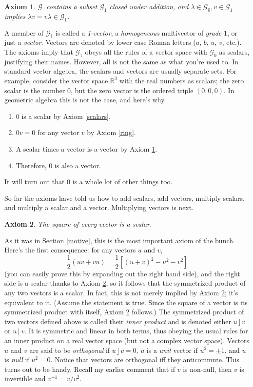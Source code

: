 \documentclass{utarticle}
\newcommand{\G}[1][]{\ensuremath{\mathcal{G}_{#1}}}
\DeclareMathOperator{\lin}{\rfloor}
\DeclareMathOperator{\rin}{\lfloor}
\newcommand{\half}{\ensuremath{\frac{1}{2}}}
\newtheorem{axiom}{Axiom}
\begin{document}
\begin{axiom}
\G\ contains a subset \G[1] closed under addition, and $\lambda \in \G[0], v \in \G[1]$ 
implies $\lambda v = v \lambda \in \G[1]$.
\label{vectors}
\end{axiom}

A member of \G[1] is called a \emph{1-vector}, a \emph{homogeneous} multivector 
of \emph{grade} $1$, or just a \emph{vector}.  Vectors are denoted by lower case 
Roman letters ($a$, $b$, $u$, $v$, etc.).  The axioms imply that \G[1] obeys all the 
rules of a vector space with \G[0] 
as scalars, justifying their names.  However, all is not the same as what
you're used to.  In standard vector algebra, the scalars and vectors are usually
separate sets.  For example, consider the vector space $\mathbb{R}^3$ 
with the real numbers as scalars; the zero scalar is the number $0$, but 
the zero vector is the ordered triple $(0,0,0)$.  In geometric algebra 
this is not the case, and here's why.
\begin{enumerate}
\item $0$ is a scalar by Axiom \ref{scalars}.
\item $0v=0$ for any vector $v$ by Axiom \ref{ring}.
\item A scalar times a vector is a vector by Axiom \ref{vectors}.
\item Therefore, $0$ is also a vector.  
\end{enumerate}
It will turn out that $0$ is a whole lot of other things too.

So far the axioms have told us how to add scalars,
add vectors, multiply scalars, and multiply a scalar and a
vector.  Multiplying vectors is next.

\begin{axiom}
The square of every vector is a scalar.
\label{sqvec}
\end{axiom}

As it was in Section \ref{motive}, this is the most important axiom of the bunch.  
Here's the first consequence: for any vectors $u$ and $v$,
\begin{equation}
\half(uv + vu) = \half\left[(u+v)^2 - u^2 - v^2\right]
\end{equation}
(you can easily prove this by expanding out the right hand side), and the right side 
is a scalar thanks to Axiom \ref{sqvec}, so it follows that the symmetrized product 
of any two vectors is a scalar.  In fact, this is not merely implied by 
Axiom \ref{sqvec}; it's equivalent to it.  (Assume the statement is true. 
Since the square of a vector is its symmetrized product with itself, Axiom \ref{sqvec} 
follows.)  The symmetrized product of two vectors defined above is called their
\emph{inner product} and is denoted either $u \lin v$ or $u \rin v$.  It is 
symmetric and linear in both terms, thus obeying the usual rules for an inner 
product on a real vector space (but not a complex vector space).  Vectors $u$ 
and $v$ are said to be \emph{orthogonal} if $u \lin v = 0$, $u$ is a \emph{unit} 
vector if $u^2=\pm1$, and $u$ is \emph{null} if $u^2=0$.  Notice that vectors 
are orthogonal iff they anticommute.  This turns out to be handy.  Recall my 
earlier comment that if $v$ is non-null, then $v$ is invertible and $v^{-1}=v/v^2$.  
\end{document}
